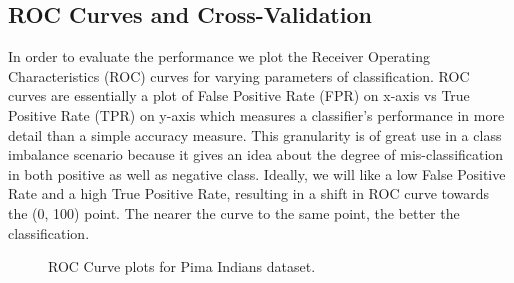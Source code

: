 \documentclass[10pt,journal,compsoc]{IEEEtran}
\begin{document}
\subsection{ROC Curves and Cross-Validation}
In order to evaluate the performance we plot the Receiver Operating Characteristics (ROC) curves for varying parameters of classification.
ROC curves are essentially a plot of False Positive Rate (FPR) on x-axis vs True Positive Rate (TPR) on y-axis which measures a classifier's performance in more detail than a simple accuracy measure.
This granularity is of great use in a class imbalance scenario because it gives an idea about the degree of mis-classification in both positive as well as negative class.  
Ideally, we will like a low False Positive Rate and a high True Positive Rate, resulting in a shift in ROC curve towards the (0, 100) point. 
The nearer the curve to the same point, the better the classification.
\begin{figure}[!b]
\centering
{}
\hfil
{}
\hfil
\caption{ROC Curve plots for Pima Indians dataset.}
\label{fig:pima}
\end{figure}
\end{document}

